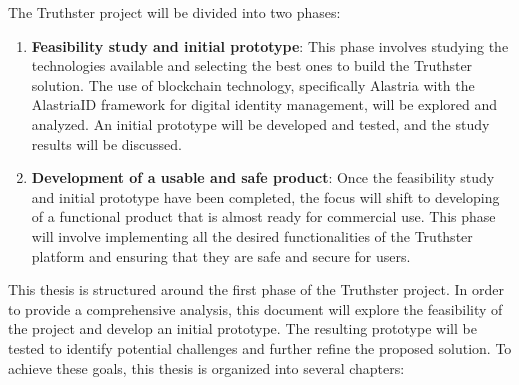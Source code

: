\documentclass[target=mst,aauheader=]{thud}
\begin{document}
The Truthster project will be divided into two phases:

\begin{enumerate}

    \item \textbf{Feasibility study and initial prototype}: This phase involves studying the technologies available and selecting the best ones to build the Truthster solution. The use of blockchain technology, specifically Alastria with the AlastriaID framework for digital identity management, will be explored and analyzed. An initial prototype will be developed and tested, and the study results will be discussed.
    \item \textbf{Development of a usable and safe product}: Once the feasibility study and initial prototype have been completed, the focus will shift to developing of a functional product that is almost ready for commercial use. This phase will involve implementing all the desired functionalities of the Truthster platform and ensuring that they are safe and secure for users.

\end{enumerate}

This thesis is structured around the first phase of the Truthster project. In order to provide a comprehensive analysis, this document will explore the feasibility of the project and develop an initial prototype. The resulting prototype will be tested to identify potential challenges and further refine the proposed solution.
To achieve these goals, this thesis is organized into several chapters:
\end{document}
